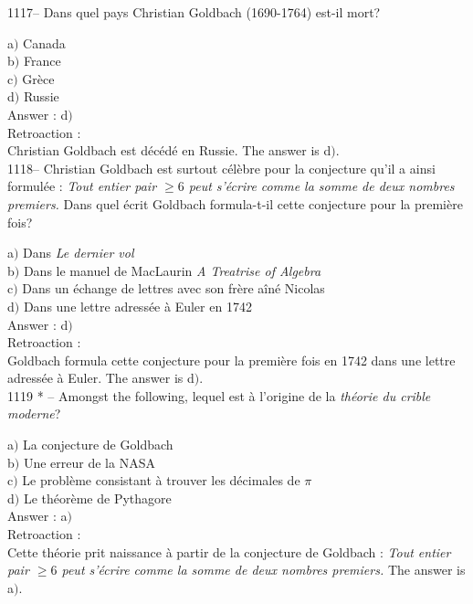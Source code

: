 ﻿\documentclass[letterpaper, 12pt]{article}
\begin{document}
1117-- Dans quel pays Christian Goldbach (1690-1764) est-il mort?

a$)$ Canada \\
b$)$ France  \\
c$)$ Gr\`ece \\
d$)$ Russie \\

Answer : d$)$\\

Retroaction : \\
Christian Goldbach est d\'ec\'ed\'e en Russie. The answer is d$)$.\\

1118-- Christian Goldbach est surtout c\'el\`ebre pour la conjecture
qu'il a ainsi formul\'ee : {\sl Tout entier pair $\ge6$ peut
s'\'ecrire comme la somme de deux nombres premiers.} Dans quel
\'ecrit Goldbach formula-t-il cette conjecture pour la premi\`ere
fois?

a$)$ Dans {\sl Le dernier vol} \\
b$)$ Dans le manuel de MacLaurin {\sl A Treatrise of Algebra} \\
c$)$ Dans un \'echange de lettres avec son fr\`ere a\^in\'e Nicolas \\
d$)$ Dans une lettre adress\'ee \`a Euler en 1742 \\

Answer : d$)$\\

Retroaction : \\
Goldbach formula cette conjecture pour la premi\`ere fois en 1742 dans une
lettre adress\'ee \`a Euler. The answer is d$)$.\\

1119 * -- Amongst the following, lequel est \`a
l'origine de la {\sl th\'eorie du crible moderne}?

a$)$ La conjecture de Goldbach \\
b$)$ Une erreur de la NASA  \\
c$)$ Le probl\`eme consistant \`a trouver les d\'ecimales de $\pi$ \\
d$)$ Le th\'eor\`eme de Pythagore \\

Answer : a$)$\\

Retroaction : \\
Cette th\'eorie prit naissance \`a partir de la conjecture de
Goldbach : {\sl Tout entier pair $\ge6$ peut s'\'ecrire comme la
somme de deux nombres premiers.}
The answer is a$)$.\\
\end{document}
